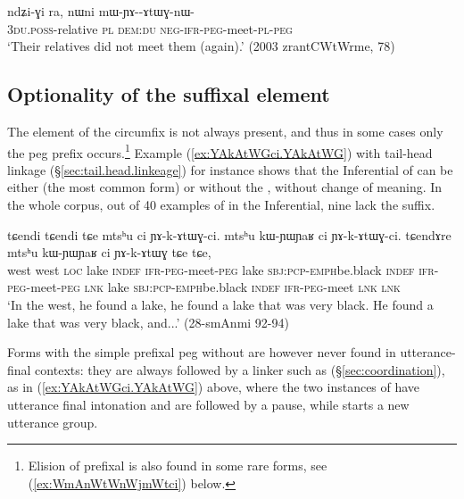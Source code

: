 \begin{exe}
\ex \label{ex:mWYAkAtWGnWci}
\gll  ndʑi-ɣi ra, nɯni mɯ-ɲɤ--ɤtɯɣ-nɯ- \\
\textsc{3du}.\textsc{poss}-relative \textsc{pl} \textsc{dem}:\textsc{du} \textsc{neg}-\textsc{ifr}-\textsc{peg}-meet-\textsc{pl}-\textsc{peg} \\
\glt `Their relatives did not meet them (again).' (2003 zrantCWtWrme, 78)
\end{exe}


\subsection{Optionality of the suffixal element} \label{sec:peg.circumfix.optionality}
The  element of the circumfix is not always present, and thus in some cases only the peg prefix  occurs.\footnote{
Elision of prefixal  is also found in some rare forms, see (\ref{ex:WmAnWtWnWjmWtci}) below. 
} Example (\ref{ex:YAkAtWGci.YAkAtWG}) with tail-head linkage (§\ref{sec:tail.head.linkeage}) for instance shows that the Inferential of  can be either  (the most common form) or  without the , without change of meaning.  In the whole corpus, out of 40 examples of  in the Inferential, nine lack the  suffix.

\begin{exe}
	\ex \label{ex:YAkAtWGci.YAkAtWG}
	\gll  tɕendi tɕendi tɕe mtsʰu ci ɲɤ-k-ɤtɯɣ-ci. mtsʰu kɯ-ɲɯ\redp{}ɲaʁ ci ɲɤ-k-ɤtɯɣ-ci. tɕendɤre mtsʰu kɯ-ɲɯ\redp{}ɲaʁ ci ɲɤ-k-ɤtɯɣ tɕe tɕe, \\
	west west \textsc{loc}  lake \textsc{indef} \textsc{ifr}-\textsc{peg}-meet-\textsc{peg}  lake \textsc{sbj}:\textsc{pcp}-\textsc{emph}\redp{}be.black \textsc{indef} \textsc{ifr}-\textsc{peg}-meet-\textsc{peg} \textsc{lnk} lake \textsc{sbj}:\textsc{pcp}-\textsc{emph}\redp{}be.black \textsc{indef} \textsc{ifr}-\textsc{peg}-meet \textsc{lnk} \textsc{lnk} \\
	\glt `In the west, he found a lake, he found a lake that was very black. He found a lake that was very black, and...' (28-smAnmi 92-94)
\end{exe}

Forms with the simple prefixal peg  without  are however never found in utterance-final contexts: they are always followed by a linker such as  (§\ref{sec:coordination}), as in (\ref{ex:YAkAtWGci.YAkAtWG}) above, where the two instances of  have utterance final intonation and are followed by a pause, while  starts a new utterance group. 


